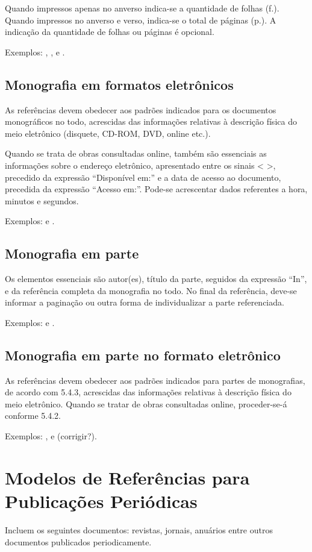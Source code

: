 \documentclass[monografia]{subfiles}
\begin{document}
Quando impressos apenas no anverso indica-se a quantidade de
folhas (f.). Quando impressos no anverso e verso, indica-se o total de
páginas (p.). A indicação da quantidade de folhas ou páginas é opcional.

	Exemplos: \cite{tese01}, \cite{dissertacao01}, \cite{monografia01}
	e \cite{tcc01}.

	\subsection{Monografia em formatos eletrônicos}
	As referências devem obedecer aos padrões indicados para os
documentos monográficos no todo, acrescidas das informações relativas
à descrição física do meio eletrônico (disquete, CD-ROM, DVD, online
etc.).

Quando se trata de obras consultadas online, também são
essenciais as informações sobre o endereço eletrônico, apresentado entre
os sinais < >, precedido da expressão “Disponível em:” e a data de
acesso ao documento, precedida da expressão “Acesso em:”. Pode-se
acrescentar dados referentes a hora, minutos e segundos.

	Exemplos: \cite{monodigital01} e \cite{monodigital02}.

	\subsection{Monografia em parte}
	Os elementos essenciais são autor(es), título da parte, seguidos da
expressão “In”, e da referência completa da monografia no todo. No
final da referência, deve-se informar a paginação ou outra forma de
individualizar a parte referenciada.

	Exemplos: \cite{monoparte01} e \cite{monoparte02}.

	\subsection{Monografia em parte no formato eletrônico}
As referências devem obedecer aos padrões indicados para partes
de monografias, de acordo com 5.4.3, acrescidas das informações
relativas à descrição física do meio eletrônico. Quando se tratar de obras
consultadas online, proceder-se-á conforme 5.4.2.

	Exemplos: \cite{monodigiparte01}, \cite{monodigiparte02} e \cite{monodigiparte03}
	(corrigir?).


	\section{Modelos de Referências para Publicações Periódicas}
	Incluem os seguintes documentos: revistas, jornais, anuários entre
outros documentos publicados periodicamente.
\end{document}
